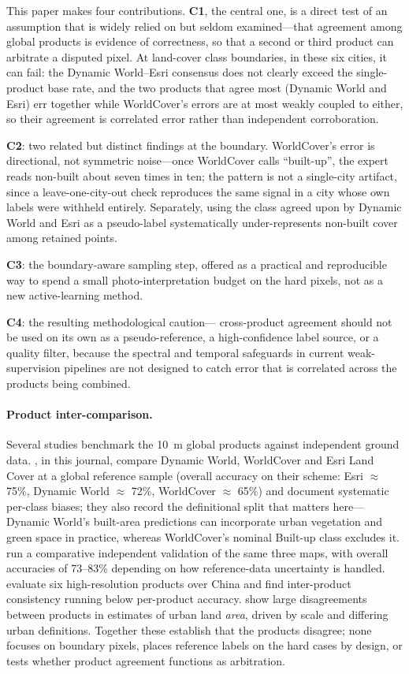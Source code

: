 \documentclass[remotesensing,article,submit,moreauthors]{Definitions/mdpi}
\begin{document}
This paper makes four contributions. \textbf{C1}, the central one, is a direct
test of an assumption that is widely relied on but seldom examined---that
agreement among global products is evidence of correctness, so that a second or
third product can arbitrate a disputed pixel. At land-cover class
boundaries, in these six cities, it can fail: the Dynamic World--Esri
consensus does not clearly exceed the single-product base rate, and the two
products that agree
most (Dynamic World and Esri) err together while WorldCover's errors are at most
weakly coupled to either, so their agreement is correlated error rather than
independent corroboration.

\textbf{C2}: two related but distinct findings at the boundary. WorldCover's
error is directional, not symmetric noise---once WorldCover calls
``built-up'', the expert reads non-built about seven times in ten; the
pattern is not a single-city artifact, since a leave-one-city-out check
reproduces the same signal in a city whose own labels were withheld
entirely.
Separately, using the class agreed upon by Dynamic World and Esri as a
pseudo-label systematically under-represents non-built cover among retained
points.

\textbf{C3}: the
boundary-aware sampling step, offered as a practical and reproducible way to
spend a small photo-interpretation budget on the hard pixels, not as a new
active-learning method.

\textbf{C4}: the resulting methodological caution---%
cross-product agreement should not be used on its own as a pseudo-reference, a
high-confidence label source, or a quality filter, because the spectral and
temporal safeguards in current weak-supervision pipelines are not designed to
catch error that is correlated across the products being combined.

\paragraph{Product inter-comparison.} Several studies benchmark the 10~m global
products against independent ground data. \citet{venter2022}, in this journal,
compare Dynamic World, WorldCover and Esri Land Cover at a global reference
sample (overall accuracy on their scheme: Esri $\approx$ 75\%, Dynamic World
$\approx$ 72\%, WorldCover $\approx$ 65\%) and document systematic per-class
biases; they also record the definitional split that matters here---Dynamic
World's built-area predictions can incorporate urban vegetation and green
space in practice, whereas WorldCover's nominal Built-up class
excludes it. \citet{xu2024} run a comparative
independent validation of the same three maps, with overall accuracies of
73--83\% depending on how reference-data uncertainty is handled.
\citet{wang2024b} evaluate six high-resolution products over China and find
inter-product consistency running below per-product accuracy.
\citet{chakraborty2024} show large disagreements between products in estimates
of urban land \emph{area}, driven by scale and differing urban definitions.
Together these establish that the products disagree; none focuses on boundary
pixels, places reference labels on the hard cases by design, or tests whether
product agreement functions as arbitration.
\end{document}
